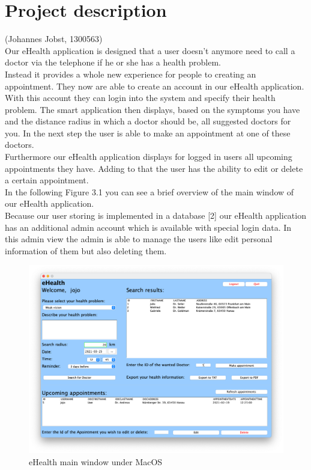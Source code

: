 \documentclass[a4paper, 12pt]{report}
\begin{document}
{\let\clearpage\relax \chapter{Project description}}
{\tiny (Johannes Jobst, 1300563)\\}
Our eHealth application is designed that a user doesn't anymore need to call a doctor via the telephone if he or she has a health problem. \\
Instead it provides a whole new experience for people to creating an appointment. They now are able to create an account in our eHealth application. With this account they can login into the system and specify their health problem. The smart application then displays, based on the symptoms you have and the distance radius in which a doctor should be, all suggested doctors for you. In the next step the user is able to make an appointment at one of these doctors. \\
Furthermore our eHealth application displays for logged in users all upcoming appointments they have. Adding to that the user has the ability to edit or delete a certain appointment. \\ In the following Figure 3.1 you can see a brief overview of the main window of our eHealth application.
\\
Because our user storing is implemented in a database [2] our eHealth application has an additional admin account which is available with special login data. In this admin view the admin is able to manage the users like edit personal information of them but also deleting them.
\\
\begin{figure}[!h]
\includegraphics[width=\linewidth]{main.png} 
\caption{eHealth main window under MacOS}
\end{figure}
\end{document}
